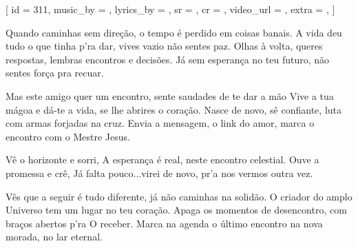 [
    id          = {311},
    music_by    = {},
    lyrics_by   = {},
    sr          = {},
    cr          = {},
    video_url   = {},
    extra       = {},
]

\beginverse
Quando caminhas sem direção, o tempo é perdido em coisas banais.
A vida deu tudo o que tinha p’ra dar, vives vazio não sentes paz.
Olhas à volta, queres respostas, lembras encontros e decisões.
Já sem esperança no teu futuro, não sentes força pra recuar.
\endverse

\beginverse
Mas este amigo quer um encontro, sente saudades de te dar a mão
Vive a tua mágoa e dá-te a vida, se lhe abrires o coração.
Nasce de novo, sê confiante, luta com armas forjadas na cruz.
Envia a mensagem, o link do amor, marca o encontro com o Mestre Jesus.
\endverse

\beginchorus
Vê o horizonte e sorri,
A esperança é real, neste encontro celestial.
Ouve a promessa e crê,
Já falta pouco...virei de novo, pr’a nos vermos outra vez.
\endchorus

\beginverse
Vês que a seguir é tudo diferente, já não caminhas na solidão.
O criador do amplo Universo tem um lugar no teu coração.
Apaga os momentos de desencontro, com braços abertos p’ra O receber. 
Marca na agenda o último encontro na nova morada, no lar eternal.
\endverse

\endsong

